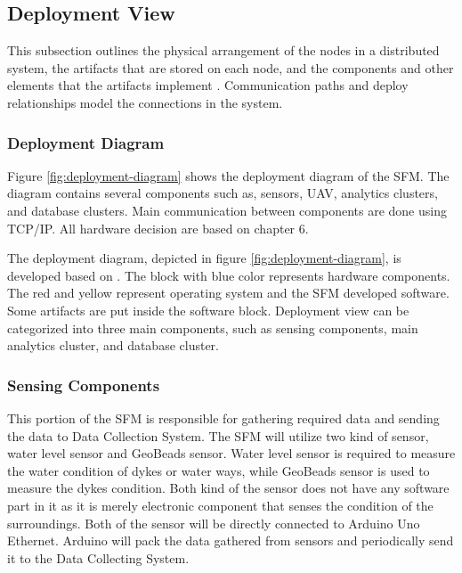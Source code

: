 \clearpage
\subsection{Deployment View}
This subsection outlines the physical arrangement of the nodes in a distributed system, the artifacts that are stored on each node, and the components and other elements that the artifacts implement \cite{ibmdeployment}. Communication paths and deploy relationships model the connections in the system.

\subsubsection{Deployment Diagram}
Figure \ref{fig:deployment-diagram} shows the deployment diagram of the \gls{SFM}. The diagram contains several components such as, sensors, \gls{UAV}, analytics clusters, and database clusters. Main communication between components are done using TCP/IP. All hardware decision are based on chapter 6.
	

\begin{landscape}
	\begin{figure}[H]
		\centering
		\texttt{[image: \{\\viewimages/deployment-view]}.png}
		\caption{Deployment diagram}
		\label{fig:deployment-diagram}
	\end{figure}
\end{landscape}


The deployment diagram, depicted in figure \ref{fig:deployment-diagram}, is developed based on \cite{ibmdeployment}. The block with blue color represents hardware components. The red and yellow represent operating system and the SFM developed software. Some artifacts are put inside the software block. Deployment view can be categorized into three main components, such as sensing components, main analytics cluster, and database cluster.

\subsubsection*{Sensing Components}
This portion of the \gls{SFM} is responsible for gathering required data and sending the data to Data Collection System. The \gls{SFM} will utilize two kind of sensor, water level sensor and GeoBeads sensor. Water level sensor is required to measure the water condition of dykes or water ways, while GeoBeads sensor is used to measure the dykes condition. Both kind of the sensor does not have any software part in it as it is merely electronic component that senses the condition of the surroundings. Both of the sensor will be directly connected to Arduino Uno Ethernet. Arduino will pack the data gathered from sensors and periodically send it to the Data Collecting System.

